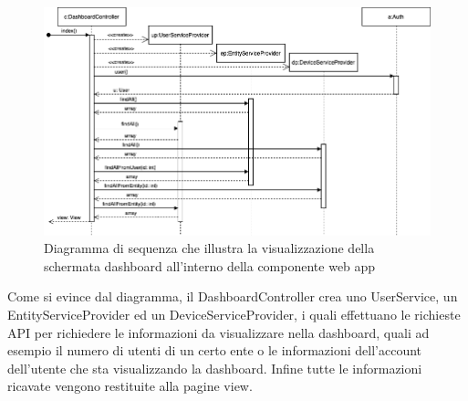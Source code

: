 \begin{landscape}
		\begin{figure}[H]
			\centering
			\includegraphics[scale=0.600]{res/images/WEBAPP/Dashboard.index.png}
			\caption{Diagramma di sequenza che illustra la visualizzazione della schermata dashboard all'interno della componente web app}
			\label{Diagramma 24}
		\end{figure}
		Come si evince dal diagramma, il DashboardController crea uno UserService, un EntityServiceProvider ed un DeviceServiceProvider, i quali effettuano le richieste API per richiedere le informazioni da visualizzare nella dashboard, quali ad esempio il numero di utenti di un certo ente o le informazioni dell'account dell'utente che sta visualizzando la dashboard. Infine tutte le informazioni ricavate vengono restituite alla pagine view.
	\end{landscape}